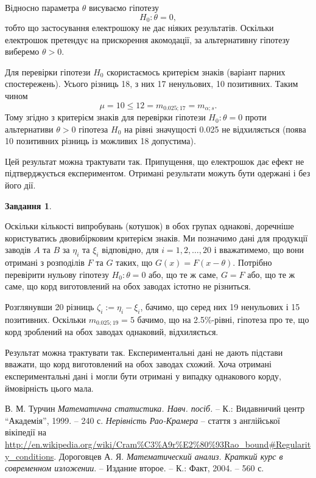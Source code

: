 \documentclass[12pt]{article} %
\newtheorem{prob}{Завдання}
\begin{document}
	Відносно параметра $\theta$ висуваємо гіпотезу
	\[H_0:\theta=0,\]
	тобто що застосування електрошоку не дає ніяких результатів. Оскільки електрошок претендує на прискорення акомодації,
	за альтернативну гіпотезу виберемо $\theta>0$.

	Для перевірки гіпотези $H_0$ скористаємось критерієм знаків (варіант парних спостережень). Усього різниць 18,
	з них 17 ненульових, 10 позитивних. Таким чином
	\[\mu=10\leq12=m_{0.025;17}=m_{\alpha;s}.\]
	Тому згідно з критерієм знаків для перевірки гіпотези $H_0:\theta=0$ проти альтернативи $\theta>0$ гіпотеза $H_0$ на
	рівні значущості 0.025 не відхиляється (поява 10 позитивних різниць із можливих 18 допустима).

	Цей результат можна трактувати так. Припущення, що електрошок дає ефект не підтверджується експериментом. Отримані
	результати можуть бути одержані і без його дії.
\setcounter{prob}{20}
\begin{prob}\end{prob}
	Оскільки кількості випробувань (котушок) в обох групах однакові, доречніше користуватись двовибірковим критерієм знаків.
	Ми позначимо дані для продукції заводів $A$ та $B$ за $\eta_i$ та $\xi_i$ відповідно, для $i=1,2,\hdots,20$ і вважатимемо,
	що вони отримані з розподілів $F$ та $G$ таких, що $G(x)=F(x-\theta)$. Потрібно перевірити нульову гіпотезу $H_0:\theta=0$
	або, що те ж саме, $G=F$ або, що те ж саме, що корд виготовлений на обох заводах істотно не різниться.

	Розглянувши 20 різниць $\zeta_i:=\eta_i-\xi_i$, бачимо, що серед них 19 ненульових і 15 позитивних. Оскільки $m_{0.025;19}=5$
	бачимо, що на 2.5\%-рівні, гіпотеза про те, що корд зроблений на обох заводах однаковий, відхиляється.

	Результат можна трактувати так. Експериментальні дані не дають підстави вважати, що корд виготовлений на обох заводах схожий.
	Хоча отримані експериментальні дані і могли бути отримані у випадку однакового корду, ймовірність цього мала.
\begin{thebibliography}{9}
В. М. Турчин \emph{Математична статистика. Навч. посіб.} --
К.: Видавничий центр ``Академія'', 1999. -- 240 с.
{\em Нерівність Рао-Крамера} -- стаття з англійської вікіпедії на
\url{http://en.wikipedia.org/wiki/Cram%C3%A9r%E2%80%93Rao_bound#Regularity_conditions}.
Дороговцев А. Я. {\em Математический анализ. Краткий курс в современном изложении}. -- Издание второе. --
	К.: Факт, 2004. -- 560 с.
\end{thebibliography}
\end{document}
